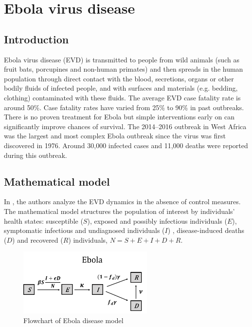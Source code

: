 \documentclass{book}
\begin{document}


\section{Ebola virus disease}
\subsection*{Introduction}
Ebola virus disease (EVD) is transmitted to people from wild animals (such as fruit bats, porcupines and non-human primates) and then spreads in the human population through direct contact with the blood, secretions, organs or other bodily fluids of infected people, and with surfaces and materials (e.g. bedding, clothing) contaminated with these fluids.
%
The average EVD case fatality rate is around 50\%. Case fatality rates have varied from 25\% to 90\% in past outbreaks. There is no proven treatment for Ebola but simple interventions early on can significantly improve chances of survival.
%
The 2014–2016 outbreak in West Africa was the largest and most complex Ebola outbreak since the virus was first discovered in 1976. Around 30,000 infected cases and 11,000 deaths were reported during this outbreak.

\subsection*{Mathematical model}
In \cite{espinoza2018consequences}, the authors analyze the EVD dynamics in the absence of control measures. The mathematical model structures the population of interest by individuals' health states:
susceptible ($S$), exposed and possibly infectious individuals ($E$), symptomatic infectious and undiagnosed individuals ($I$) , disease-induced deaths ($D$) and recovered ($R$) individuals, $N=S+E+I+D+R$. 

\begin{figure}[H]
    \centering
    \includegraphics[width = 0.6\textwidth]{Flowcharts/ebola.png}
    \caption{Flowchart of Ebola disease model}
    \label{fig:ebola_flow}
\end{figure}
\end{document}
